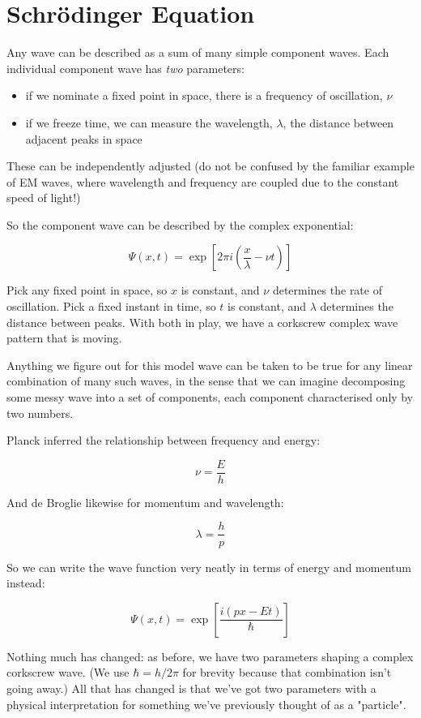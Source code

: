 \section{Schrödinger Equation}

Any wave can be described as a sum of many simple component waves. Each individual component wave has \textit{two} parameters:

\begin{itemize}
  \item if we nominate a fixed point in space, there is a frequency of oscillation, $\nu$
  \item if we freeze time, we can measure the wavelength, $\lambda$, the distance between adjacent peaks in space
\end{itemize}

These can be independently adjusted (do not be confused by the familiar example of EM waves, where wavelength and frequency are coupled due to the constant speed of light!)

So the component wave can be described by the complex exponential:

$$
\Psi(x, t) = \exp \left[ 2\pi i(\frac{x}{\lambda} - \nu t) \right]
$$

Pick any fixed point in space, so $x$ is constant, and $\nu$ determines the rate of oscillation. Pick a fixed instant in time, so $t$ is constant, and $\lambda$ determines the distance between peaks. With both in play, we have a corkscrew complex wave pattern that is moving.

Anything we figure out for this model wave can be taken to be true for any linear combination of many such waves, in the sense that we can imagine decomposing some messy wave into a set of components, each component characterised only by two numbers.

Planck inferred the relationship between frequency and energy:

$$\nu = \frac{E}{h}$$

And de Broglie likewise for momentum and wavelength:

$$\lambda = \frac{h}{p}$$

So we can write the wave function very neatly in terms of energy and momentum instead:

$$
\Psi(x, t) = \exp \left[ {\frac{i(px - Et)}{\hbar}} \right]
$$

Nothing much has changed: as before, we have two parameters shaping a complex corkscrew wave. (We use $\hbar = h/2\pi$ for brevity because that combination isn't going away.) All that has changed is that we've got two parameters with a physical interpretation for something we've previously thought of as a "particle".

